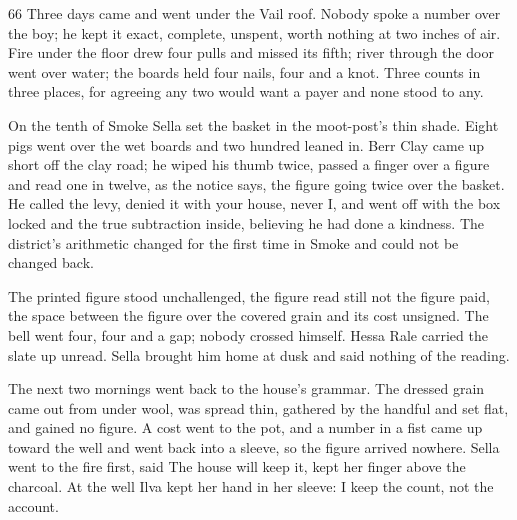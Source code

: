 
\scenebreak


\scenebreak


\scenebreak

\CRtailpiece
\begin{CRchronicle}{66}
Three days came and went under the Vail roof. Nobody spoke a number over the boy; he kept it exact, complete, unspent, worth nothing at two inches of air. Fire under the floor drew four pulls and missed its fifth; river through the door went over water; the boards held four nails, four and a knot. Three counts in three places, for agreeing any two would want a payer and none stood to any.

On the tenth of Smoke Sella set the basket in the moot-post’s thin shade. Eight pigs went over the wet boards and two hundred leaned in. Berr Clay came up short off the clay road; he wiped his thumb twice, passed a finger over a figure and read one in twelve, as the notice says, the figure going twice over the basket. He called the levy, denied it with your house, never I, and went off with the box locked and the true subtraction inside, believing he had done a kindness. The district’s arithmetic changed for the first time in Smoke and could not be changed back.

The printed figure stood unchallenged, the figure read still not the figure paid, the space between the figure over the covered grain and its cost unsigned. The bell went four, four and a gap; nobody crossed himself. Hessa Rale carried the slate up unread. Sella brought him home at dusk and said nothing of the reading.

The next two mornings went back to the house’s grammar. The dressed grain came out from under wool, was spread thin, gathered by the handful and set flat, and gained no figure. A cost went to the pot, and a number in a fist came up toward the well and went back into a sleeve, so the figure arrived nowhere. Sella went to the fire first, said The house will keep it, kept her finger above the charcoal. At the well Ilva kept her hand in her sleeve: I keep the count, not the account.


\end{CRchronicle}
